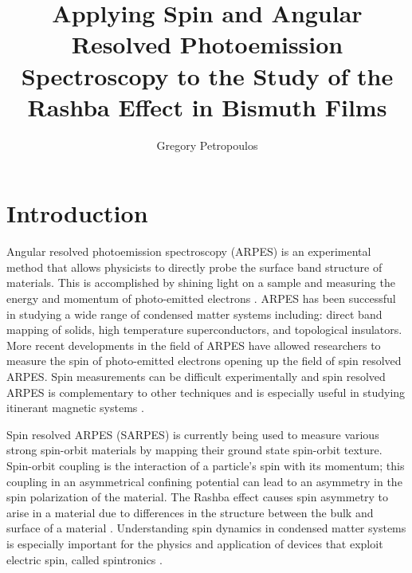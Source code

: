 \documentclass[12pt]{article}
\begin{document}
\title{Applying Spin and Angular Resolved Photoemission Spectroscopy to the Study of the Rashba Effect in Bismuth Films}
\author{Gregory Petropoulos}
\maketitle
{}

\section{Introduction}
Angular resolved photoemission spectroscopy (ARPES) is an experimental method that allows physicists to directly probe the surface band structure of materials.
This is accomplished by shining light on a sample and measuring the energy and momentum of photo-emitted electrons \cite{Damascelli}.
ARPES has been successful in studying a wide range of condensed matter systems including:  direct band mapping of solids,  high temperature superconductors, and topological insulators.
More recent developments in the field of ARPES have allowed researchers to measure the spin of photo-emitted electrons \cite{Dil, Osterwalder} opening up the field of spin resolved ARPES.
Spin measurements can be difficult experimentally and spin resolved ARPES is complementary to other techniques and is especially useful in studying itinerant magnetic systems \cite{Osterwalder}.

Spin resolved ARPES (SARPES) is currently being used to measure various strong spin-orbit materials by mapping their ground state spin-orbit texture.
Spin-orbit coupling is the interaction of a particle's spin with its momentum; this coupling in an asymmetrical confining potential can lead to an asymmetry in the spin polarization of the material.
The Rashba effect causes spin asymmetry to arise in a material due to differences in the structure between the bulk and surface of a material \cite{Dil}.
Understanding spin dynamics in condensed matter systems is especially important for the physics and application of devices that exploit electric spin, called spintronics \cite{wolf}.
\end{document}
